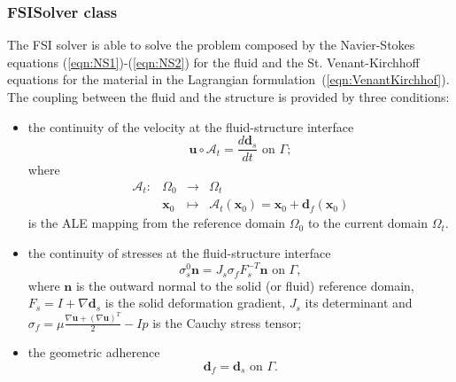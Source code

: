 \documentclass[11pt]{article}
\begin{document}

\subsubsection{FSISolver class}
The FSI solver is able to solve the problem composed by the Navier-Stokes equations (\ref{eqn:NS1})-(\ref{eqn:NS2}) for the fluid and the St. Venant-Kirchhoff equations for the material in the Lagrangian formulation~(\ref{eqn:VenantKirchhof}). The coupling between the fluid and the structure is provided by three conditions:
\begin{itemize}
\item the continuity of the velocity at the fluid-structure interface
\begin{equation}
\mathbf{u}\circ\mathcal{A}_t=\frac{d\mathbf{d}_s}{dt} \text{ on }\Gamma;
\end{equation}
where
\begin{equation}
\begin{array}{rrcl}
\mathcal{A}_t: & \Omega_0 & \rightarrow & \Omega_t\nonumber\\
& \mathbf{x}_0 & \mapsto & \mathcal{A}_t(\mathbf{x}_0)=\mathbf{x}_0+\mathbf{d}_f(\mathbf{x}_0)
\end{array}
\end{equation}
is the ALE mapping from the reference domain $\Omega_0$ to the current domain $\Omega_t$.
\item the continuity of stresses at the fluid-structure interface
\begin{equation}
\sigma_s^0\mathbf{n}=J_s\sigma_fF_s^{-T}\mathbf{n} \text{ on }\Gamma,
\end{equation}
where $\mathbf{n}$ is the outward normal to the solid (or fluid) reference domain, $F_s=I+\nabla\mathbf{d}_s$ is the solid deformation gradient, $J_s$ its determinant and $\sigma_f=\mu\frac{\nabla\mathbf{u}+(\nabla\mathbf{u})^T}{2}-Ip$ is the Cauchy stress tensor;
\item the geometric adherence
\begin{equation}
\mathbf{d}_f = \mathbf{d}_s \text{ on }\Gamma.
\end{equation}
\end{itemize}
\end{document}

